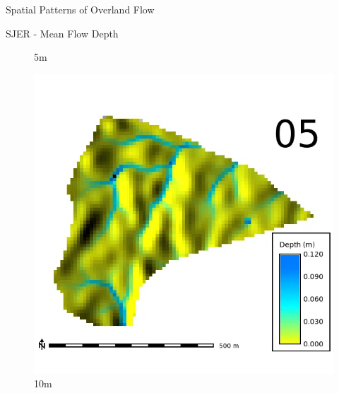 \documentclass[
  ignorenonframetext,
]{beamer}
\begin{document}
\begin{frame}{Spatial Patterns of Overland Flow}
\begin{block}{SJER - Mean Flow Depth}
\begin{figure}[H]
{}

\caption{5m}

\end{figure}%

\begin{figure}[H]

{\centering \includegraphics{../output/SJER/sensitivity_1/SJER_depth_10_1_s_average.webp}

}

\caption{10m}

\end{figure}%

\begin{figure}[H]


\end{figure}
\end{block}
\end{frame}
\end{document}
